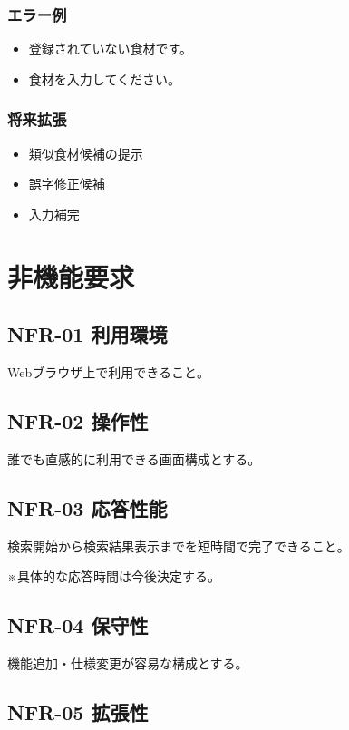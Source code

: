 \documentclass[a4paper,12pt]{jarticle}
\begin{document}
\subsubsection*{エラー例}
\begin{itemize}
    \item 登録されていない食材です。
    \item 食材を入力してください。
\end{itemize}

\subsubsection*{将来拡張}
\begin{itemize}
    \item 類似食材候補の提示
    \item 誤字修正候補
    \item 入力補完
\end{itemize}

\section{非機能要求}

\subsection{NFR-01 利用環境}

Webブラウザ上で利用できること。

\subsection{NFR-02 操作性}

誰でも直感的に利用できる画面構成とする。

\subsection{NFR-03 応答性能}

検索開始から検索結果表示までを短時間で完了できること。

※具体的な応答時間は今後決定する。

\subsection{NFR-04 保守性}

機能追加・仕様変更が容易な構成とする。

\subsection{NFR-05 拡張性}
\end{document}
